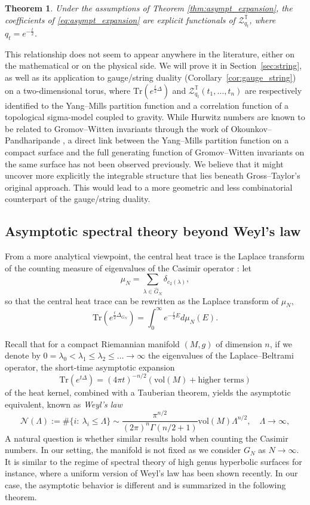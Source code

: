 \documentclass[11pt,a4paper,reqno]{article}
\newtheorem{theorem}{Theorem}[section]
\theoremstyle{definition}
\theoremstyle{remark}
\newcommand\Tr{\mathrm{Tr}}
\newcommand\vol{\mathrm{vol}}
\newcommand\Tbb{\mathbb{T}}
\begin{document}
\begin{theorem}\label{thm:coef_Hurwitz}
Under the assumptions of Theorem \ref{thm:asympt_expansion}, the coefficients of \eqref{eq:asympt_expansion} are explicit functionals of $\mathcal{Z}_{q_t}^\Tbb$, where $q_t=e^{-\frac{t}{2}}$.
\end{theorem}

This relationship does not seem to appear anywhere in the literature, either on the mathematical or on the physical side. We will prove it in Section~\ref{sec:string}, as well as its application to gauge/string duality (Corollary~\ref{cor:gauge_string}) on a two-dimensional torus, where $\Tr(e^{\frac t2\Delta})$ and $\mathcal{Z}_{q_t}^\Tbb(t_1,\ldots,t_n)$ are respectively identified to the Yang--Mills partition function and a correlation function of a topological sigma-model coupled to gravity. While Hurwitz numbers are known to be related to Gromov--Witten invariants through the work of Okounkov--Pandharipande \cite{OP2}, a direct link between the Yang--Mills partition function on a compact surface and the full generating function of Gromov--Witten invariants on the same surface has not been observed previously. We believe that it might uncover more explicitly the integrable structure that lies beneath Gross--Taylor's original approach. This would lead to a more geometric and less combinatorial counterpart of the gauge/string duality.



\subsection{Asymptotic spectral theory beyond Weyl's law}

From a more analytical viewpoint, the central heat trace is the Laplace transform of the counting measure of eigenvalues of the Casimir operator : let
\[
\mu_N=\sum_{\lambda\in\widehat{G}_N}\delta_{c_2(\lambda)},
\]
so that the central heat trace can be rewritten as the Laplace transform of $\mu_N,$
\[
\Tr(e^{\frac{t}{2}\Delta_{G_N}})=\int_0^\infty e^{-\frac{t}{2}E}d\mu_N(E).
\]



 Recall that for a compact Riemannian manifold $(M,g)$ of dimension $n$, if we denote by $0=\lambda_0<\lambda_1\leq\lambda_2\leq\ldots\to\infty$ the eigenvalues of the Laplace--Beltrami operator, the short-time asymptotic expansion
\[
\Tr(e^{t\Delta})=(4\pi t)^{-n/2}(\vol(M)+\text{higher terms})
\]
of the heat kernel, combined with a Tauberian theorem, yields the asymptotic equivalent, known as \emph{Weyl's law}
\[
\mathcal{N}(\Lambda):=\#\{i:\ \lambda_i\leq \Lambda\}\sim\frac{\pi^{n/2}}{(2\pi)^n\Gamma(n/2+1)}\vol(M)\Lambda^{n/2},\quad \Lambda\to\infty,
\]
A natural question is whether similar results hold when counting the Casimir numbers. In our setting, the manifold is not  fixed as we consider $G_N$ as $N\to\infty.$ It is similar to the regime of spectral theory of high genus hyperbolic surfaces for instance, where a uniform version of Weyl's law \cite{Mon22} has been shown recently. In our case, the asymptotic behavior is  different and is summarized in the following theorem.
\end{document}
